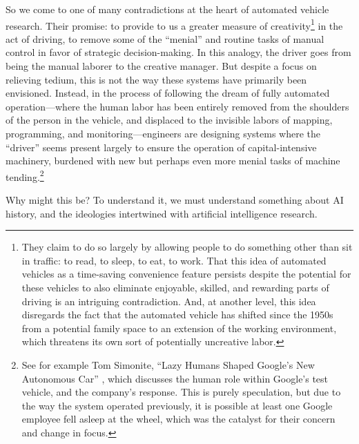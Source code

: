 So we come to one of many contradictions at the heart of
automated vehicle research. Their promise:
to provide to us a greater measure of creativity\footnote{They claim
  to do so largely by allowing people to do something other than sit
  in traffic: to read, to sleep, to eat, to work. That this idea of
  automated vehicles as a time-saving convenience feature persists
  despite the potential for these vehicles to also eliminate
  enjoyable, skilled, and rewarding parts of driving is an intriguing
  contradiction. And, at another level, this idea disregards the fact
  that the automated vehicle has shifted since the 1950s from a
  potential family space to an extension of the working environment,
  which threatens its own sort of potentially uncreative labor.} in the act of
driving, to remove some of the ``menial'' and routine tasks of manual
control in favor of strategic decision-making. In this analogy, the
driver goes from being the manual laborer to the creative manager. But
despite a focus on relieving tedium, this is not the way these systems
have primarily been envisioned. Instead, in the process of following
the dream of fully automated operation---where the human labor has been
entirely removed from the shoulders of the person in the vehicle, and
displaced to the invisible labors of mapping, programming, and
monitoring---engineers are designing systems where the ``driver''
seems present largely to ensure the operation of capital-intensive
machinery, burdened with new but perhaps even more menial tasks of
machine tending.\footnote{See for example Tom Simonite, ``Lazy Humans
Shaped Google's New Autonomous Car'' \cite{simonite}, which discusses
the human role within Google's test vehicle,
and the company's response. This is purely speculation, but due to
the way the system operated previously, it is possible at least one Google
employee fell asleep at the wheel, which was the catalyst for their
concern and change in focus.} 

Why might this be? To understand it, we must understand something
about AI history, and the ideologies intertwined with artificial
intelligence research.


